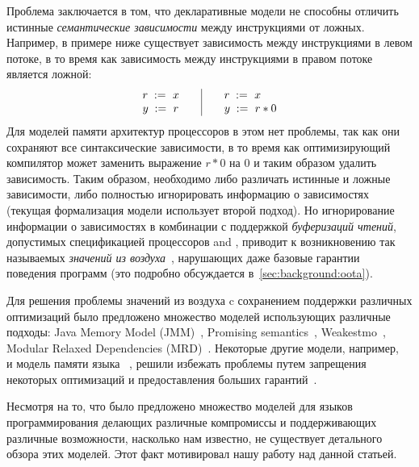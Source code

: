 Проблема заключается в том, что декларативные модели не способны 
отличить истинные \emph{семантические зависимости} между инструкциями от ложных.
Например, в примере ниже существует  зависимость между 
инструкциями в левом потоке, в то время как зависимость между 
инструкциями в правом потоке является ложной:
\[\begin{array}{l@{\qquad}|@{\qquad}l}
\readInst{}{r}{x} & \readInst{}{r}{x} \\
\writeInst{}{y}{r} & \readInst{}{y}{r * 0} \\
\end{array}\]
Для моделей памяти архитектур процессоров в этом нет проблемы, 
так как они сохраняют все синтаксические зависимости, 
в то время как оптимизирующий компилятор может заменить выражение 
$r * 0$ на $0$ и таким образом удалить зависимость. 
Таким образом, необходимо либо различать истинные и ложные зависимости, 
либо полностью игнорировать информацию о зависимостях 
(текущая формализация модели \CPP использует второй подход).
Но игнорирование информации о зависимостях в комбинации с 
поддержкой \emph{буферизаций чтений}, допустимых 
спецификацией процессоров \ARM and \POWER, 
приводит к возникновению так называемых 
\emph{значений из воздуха}~\cite{Boehm-Demsky:MSPC14}, 
нарушающих даже базовые гарантии  поведения программ
(это подробно обсуждается в~\cref{sec:background:oota}).

Для решения проблемы значений из воздуха c сохранением
поддержки различных оптимизаций было предложено 
множество моделей использующих различные подходы:
Java Memory Model (JMM)~\cite{Manson-al:POPL05}, Promising semantics~\cite{Kang-al:POPL17,Lee-al:PLDI20},
Weakestmo~\cite{Chakraborty-Vafeiadis:POPL19}, Modular Relaxed Dependencies (MRD)~\cite{Paviotti-al:ESOP20}.
Некоторые другие модели, например, \RCMM~\cite{Lahav-al:PLDI17} и модель памяти языка \OCaml~\cite{Dolan-al:PLDI18},
решили избежать проблемы путем запрещения некоторых оптимизаций и предоставления больших гарантий~\cite{Ou-Demsky:OOPSLA18}.

Несмотря на то, что было предложено множество моделей для языков программирования
делающих различные компромиссы и поддерживающих различные возможности, 
насколько нам известно, не существует детального обзора этих моделей. 
Этот факт мотивировал нашу работу над данной статьей.
